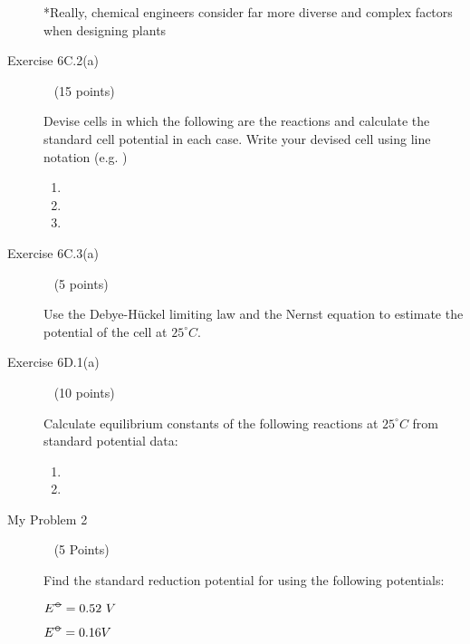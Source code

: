 \documentclass[12pt, openany, letterpaper]{memoir}
\begin{document}
\begin{description}
	      \vspace{7em}
	      *Really, chemical engineers consider far more diverse and complex factors when designing plants

	      \vspace{2em}
	\item [Exercise 6C.2(a)] ~ (15 points)

	      Devise cells in which the following are the reactions and calculate the standard cell potential in each case. Write your devised cell using line notation (e.g. )
	      \begin{enumerate}
		      \item {}

		            \vspace{6em}
		      \item {}

		            \vspace{6em}
		      \item {}
	      \end{enumerate}

	      \vspace{6em}

	\item [Exercise 6C.3(a)] ~ (5 points)

	      Use the Debye-H\"uckel limiting law and the Nernst equation to estimate the potential of the cell  at $25^\circ C$.

	      \vspace{25em}
	\item [Exercise 6D.1(a)] ~ (10 points)

	      Calculate equilibrium constants of the following reactions at $25^\circ C$ from standard potential data:
	      \begin{enumerate}
		      \item {}

		            \vspace{13em}
		      \item {}
	      \end{enumerate}

	      \vspace{13em}
	\item [My Problem 2] ~ (5 Points)

	      Find the standard reduction potential for  using the following potentials:

	       \hspace{2em}$E^{\std} = 0.52~V$

	       \hspace{2em}$E^{\std} = 0.16V$


\end{description}
\end{document}
